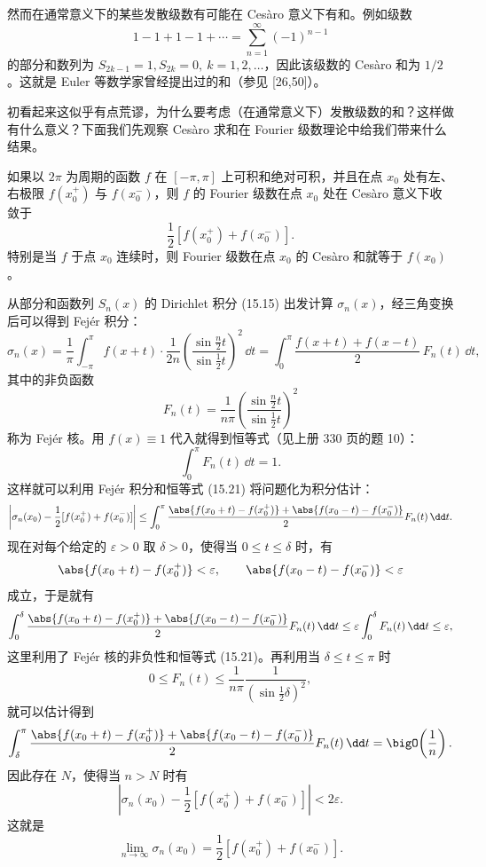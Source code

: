然而在通常意义下的某些发散级数有可能在 Cesàro 意义下有和。例如级数
\[
  1-1+1-1+\cdots=\sum_{n=1}^{\infty}(-1)^{n-1}
\]
的部分和数列为 $S_{2k-1}=1,S_{2k}=0,\ k=1,2,\ldots$，因此该级数的 Cesàro 和为 $1/2$。这就是 Euler 等数学家曾经提出过的和（参见 [26,50]）。

初看起来这似乎有点荒谬，为什么要考虑（在通常意义下）发散级数的和？这样做有什么意义？下面我们先观察 Cesàro 求和在 Fourier 级数理论中给我们带来什么结果。

\begin{xproposition}[15.2.1（Fejér 定理）]
如果以 $2\pi$ 为周期的函数 $f$ 在 $[-\pi,\pi]$ 上可积和绝对可积，并且在点 $x_0$ 处有左、右极限 $f(x_0^+)$ 与 $f(x_0^-)$，则 $f$ 的 Fourier 级数在点 $x_0$ 处在 Cesàro 意义下收敛于
\[
  \frac12[f(x_0^+)+f(x_0^-)].
\]
特别是当 $f$ 于点 $x_0$ 连续时，则 Fourier 级数在点 $x_0$ 的 Cesàro 和就等于 $f(x_0)$。
\end{xproposition}

\begin{xproof}
从部分和函数列 $S_n(x)$ 的 Dirichlet 积分 (15.15) 出发计算 $\sigma_n(x)$，经三角变换后可以得到 Fejér 积分：
\[
  \sigma_n(x)=\frac1\pi\int_{-\pi}^{\pi}f(x+t)\cdot\frac1{2n}
  \left(\frac{\sin\frac n2t}{\sin\frac12t}\right)^2\,\dd t
  =\int_0^{\pi}\frac{f(x+t)+f(x-t)}2\,F_n(t)\,\dd t,
\]
其中的非负函数
\begin{equation}
  F_n(t)=\frac1{n\pi}\left(\frac{\sin\frac n2t}{\sin\frac12t}\right)^2
  \tag{15.20}
  \label{eq:15.20}
\end{equation}
称为 Fejér 核。用 $f(x)\equiv1$ 代入就得到恒等式（见上册 330 页的题 10）：
\begin{equation}
  \int_0^{\pi}F_n(t)\,\dd t=1.
  \tag{15.21}
  \label{eq:15.21}
\end{equation}
这样就可以利用 Fejér 积分和恒等式 (15.21) 将问题化为积分估计：
\[
  \left|\sigma_n(x_0)-\frac12[f(x_0^+)+f(x_0^-)]\right|
  \le\int_0^{\pi}
  \frac{\abs{f(x_0+t)-f(x_0^+)}+\abs{f(x_0-t)-f(x_0^-)}}2F_n(t)\,\dd t.
\]
现在对每个给定的 $\varepsilon>0$ 取 $\delta>0$，使得当 $0\le t\le\delta$ 时，有
\[
  \abs{f(x_0+t)-f(x_0^+)}<\varepsilon,
  \qquad
  \abs{f(x_0-t)-f(x_0^-)}<\varepsilon
\]
成立，于是就有
\[
  \int_0^{\delta}
  \frac{\abs{f(x_0+t)-f(x_0^+)}+\abs{f(x_0-t)-f(x_0^-)}}2F_n(t)\,\dd t
  \le\varepsilon\int_0^{\delta}F_n(t)\,\dd t\le\varepsilon,
\]
这里利用了 Fejér 核的非负性和恒等式 (15.21)。再利用当 $\delta\le t\le\pi$ 时
\[
  0\le F_n(t)\le\frac1{n\pi}\frac1{(\sin\frac12\delta)^2},
\]
就可以估计得到
\[
  \int_{\delta}^{\pi}
  \frac{\abs{f(x_0+t)-f(x_0^+)}+\abs{f(x_0-t)-f(x_0^-)}}2F_n(t)\,\dd t
  =\bigO\!\left(\frac1n\right).
\]
因此存在 $N$，使得当 $n>N$ 时有
\[
  \left|\sigma_n(x_0)-\frac12[f(x_0^+)+f(x_0^-)]\right|<2\varepsilon.
\]
这就是
\[
  \lim_{n\to\infty}\sigma_n(x_0)=\frac12[f(x_0^+)+f(x_0^-)].
\]
\end{xproof}

